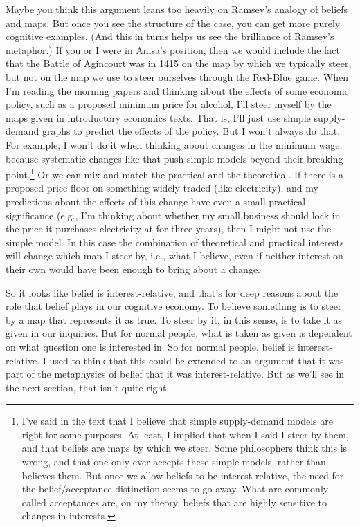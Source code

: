 \documentclass[
  11pt,
]{book}
\begin{document}
Maybe you think this argument leans too heavily on Ramsey's analogy of beliefs and maps. But once you see the structure of the case, you can get more purely cognitive examples. (And this in turns helps us see the brilliance of Ramsey's metaphor.) If you or I were in Anisa's position, then we would include the fact that the Battle of Agincourt was in 1415 on the map by which we typically steer, but not on the map we use to steer ourselves through the Red-Blue game. When I'm reading the morning papers and thinking about the effects of some economic policy, such as a proposed minimum price for alcohol, I'll steer myself by the maps given in introductory economics texts. That is, I'll just use simple supply-demand graphs to predict the effects of the policy. But I won't always do that. For example, I won't do it when thinking about changes in the minimum wage, because systematic changes like that push simple models beyond their breaking point.\footnote{I've said in the text that I believe that simple supply-demand models are right for some purposes. At least, I implied that when I said I steer by them, and that beliefs are maps by which we steer. Some philosophers think this is wrong, and that one only ever accepts these simple models, rather than believes them. But once we allow beliefs to be interest-relative, the need for the belief/acceptance distinction seems to go away. What are commonly called acceptances are, on my theory, beliefs that are highly sensitive to changes in interests.} Or we can mix and match the practical and the theoretical. If there is a proposed price floor on something widely traded (like electricity), and my predictions about the effects of this change have even a small practical significance (e.g., I'm thinking about whether my small business should lock in the price it purchases electricity at for three years), then I might not use the simple model. In this case the combination of theoretical and practical interests will change which map I steer by, i.e., what I believe, even if neither interest on their own would have been enough to bring about a change.

So it looks like belief is interest-relative, and that's for deep reasons about the role that belief plays in our cognitive economy. To believe something is to steer by a map that represents it as true. To steer by it, in this sense, is to take it as given in our inquiries. But for normal people, what is taken as given is dependent on what question one is interested in. So for normal people, belief is interest-relative. I used to think that this could be extended to an argument that it was part of the metaphysics of belief that it was interest-relative. But as we'll see in the next section, that isn't quite right.
\end{document}
